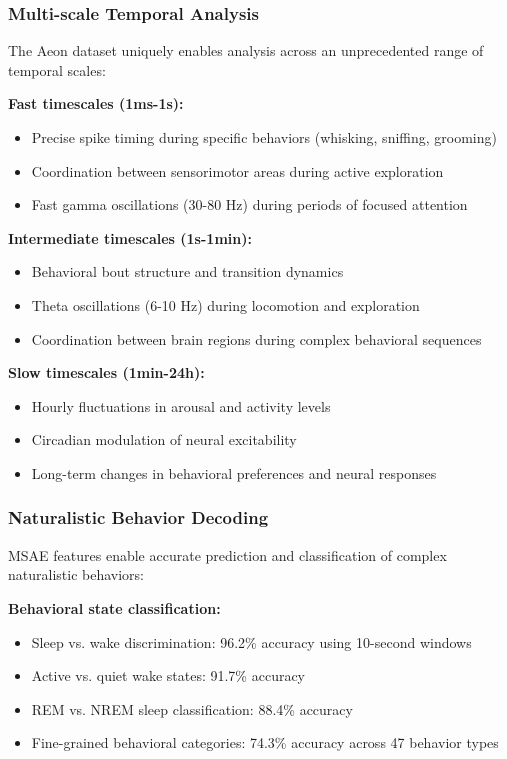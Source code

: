 \subsubsection{Multi-scale Temporal Analysis}

The Aeon dataset uniquely enables analysis across an unprecedented range of temporal scales:

\textbf{Fast timescales (1ms-1s):}
\begin{itemize}
\item Precise spike timing during specific behaviors (whisking, sniffing, grooming)
\item Coordination between sensorimotor areas during active exploration
\item Fast gamma oscillations (30-80 Hz) during periods of focused attention
\end{itemize}

\textbf{Intermediate timescales (1s-1min):}
\begin{itemize}
\item Behavioral bout structure and transition dynamics
\item Theta oscillations (6-10 Hz) during locomotion and exploration
\item Coordination between brain regions during complex behavioral sequences
\end{itemize}

\textbf{Slow timescales (1min-24h):}
\begin{itemize}
\item Hourly fluctuations in arousal and activity levels
\item Circadian modulation of neural excitability
\item Long-term changes in behavioral preferences and neural responses
\end{itemize}

\subsubsection{Naturalistic Behavior Decoding}

MSAE features enable accurate prediction and classification of complex naturalistic behaviors:

\textbf{Behavioral state classification:}
\begin{itemize}
\item Sleep vs. wake discrimination: 96.2\% accuracy using 10-second windows
\item Active vs. quiet wake states: 91.7\% accuracy
\item REM vs. NREM sleep classification: 88.4\% accuracy
\item Fine-grained behavioral categories: 74.3\% accuracy across 47 behavior types
\end{itemize}

